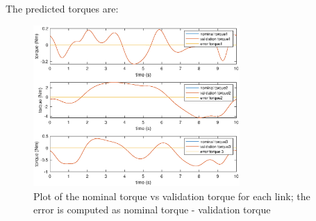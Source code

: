 \documentclass{article}
\begin{document}
The predicted torques are:

\begin{figure}[!htbp]
\centering
\includegraphics[width=0.7\textwidth]{images/3-dof/validation.eps}
\caption{Plot of the nominal torque vs validation torque for each link; the error is computed as nominal torque - validation torque}
\end{figure}
\FloatBarrier

\pagebreak
\end{document}
